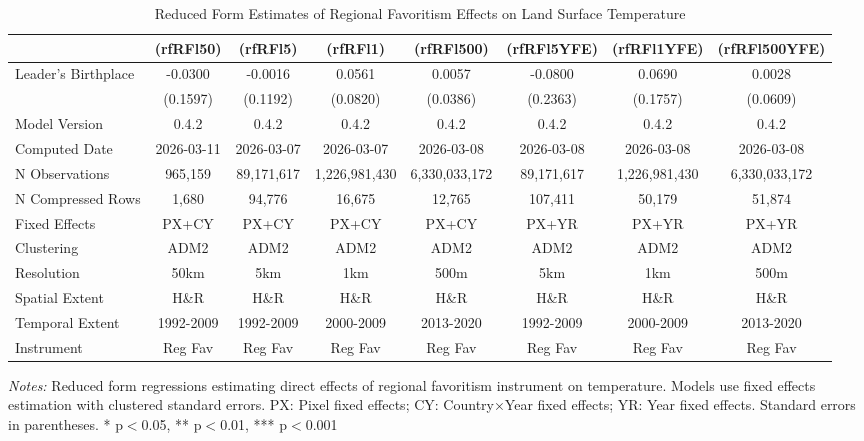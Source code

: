 \begin{table}[htbp]
\centering
\footnotesize
\caption{Reduced Form Estimates of Regional Favoritism Effects on Land Surface Temperature}
\begin{tabular}{lccccccc}
\toprule
 & (rfRFl50) & (rfRFl5) & (rfRFl1) & (rfRFl500) & (rfRFl5YFE) & (rfRFl1YFE) & (rfRFl500YFE) \\
\midrule
Leader's Birthplace & -0.0300 & -0.0016 & 0.0561 & 0.0057 & -0.0800 & 0.0690 & 0.0028 \\
 & (0.1597) & (0.1192) & (0.0820) & (0.0386) & (0.2363) & (0.1757) & (0.0609) \\
\midrule
Model Version & 0.4.2 & 0.4.2 & 0.4.2 & 0.4.2 & 0.4.2 & 0.4.2 & 0.4.2 \\
Computed Date & 2026-03-11 & 2026-03-07 & 2026-03-07 & 2026-03-08 & 2026-03-08 & 2026-03-08 & 2026-03-08 \\
N Observations & 965,159 & 89,171,617 & 1,226,981,430 & 6,330,033,172 & 89,171,617 & 1,226,981,430 & 6,330,033,172 \\
N Compressed Rows & 1,680 & 94,776 & 16,675 & 12,765 & 107,411 & 50,179 & 51,874 \\
\midrule
Fixed Effects & PX+CY & PX+CY & PX+CY & PX+CY & PX+YR & PX+YR & PX+YR \\
Clustering & ADM2 & ADM2 & ADM2 & ADM2 & ADM2 & ADM2 & ADM2 \\
Resolution & 50km & 5km & 1km & 500m & 5km & 1km & 500m \\
Spatial Extent & H\&R & H\&R & H\&R & H\&R & H\&R & H\&R & H\&R \\
Temporal Extent & 1992-2009 & 1992-2009 & 2000-2009 & 2013-2020 & 1992-2009 & 2000-2009 & 2013-2020 \\
Instrument & Reg Fav & Reg Fav & Reg Fav & Reg Fav & Reg Fav & Reg Fav & Reg Fav \\
\bottomrule
\end{tabular}
\begin{threeparttable}
\begin{tablenotes}\small
\item \textit{Notes:} Reduced form regressions estimating direct effects of regional favoritism instrument on temperature. Models use  fixed effects estimation with clustered standard errors. PX: Pixel fixed effects; CY: Country×Year fixed effects; YR: Year fixed effects. Standard errors in parentheses. * p$<$0.05, ** p$<$0.01, *** p$<$0.001
\end{tablenotes}
\end{threeparttable}
\end{table}